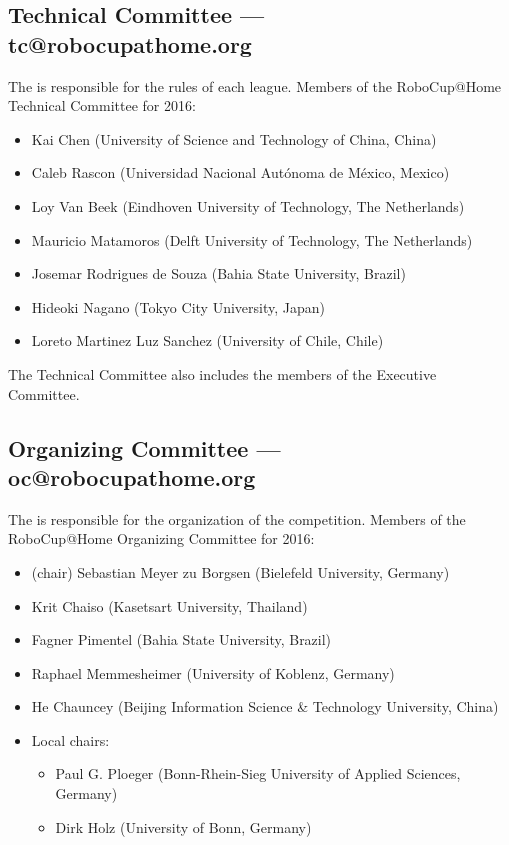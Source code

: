 \subsection{Technical Committee --- tc@robocupathome.org}
\label{sec:tc}
The  is responsible for the rules of each league. Members of the RoboCup@Home Technical Committee for 2016:
\begin{itemize}
\item Kai Chen (University of Science and Technology of China, China)
\item Caleb Rascon (Universidad Nacional Aut{\'o}noma de M{\'e}xico, Mexico)
\item Loy Van Beek (Eindhoven University of Technology, The Netherlands)
\item Mauricio Matamoros  (Delft University of Technology, The Netherlands)
\item Josemar Rodrigues de Souza (Bahia State University, Brazil)
\item Hideoki Nagano (Tokyo City University, Japan)
\item Loreto Martinez Luz Sanchez (University of Chile, Chile)
\end{itemize}
The Technical Committee also includes the members of the Executive Committee.

\subsection{Organizing Committee --- oc@robocupathome.org}
\label{sec:oc}
The  is responsible for the organization of the competition. Members of the RoboCup@Home Organizing Committee for 2016:

\begin{itemize}
\item (chair) Sebastian Meyer zu Borgsen (Bielefeld University, Germany)
\item Krit Chaiso (Kasetsart University, Thailand)
\item Fagner Pimentel (Bahia State University, Brazil)
\item Raphael Memmesheimer (University of Koblenz, Germany)
\item He Chauncey (Beijing Information Science \& Technology University, China)
\item Local chairs:
  \begin{itemize}
    \item Paul G. Ploeger (Bonn-Rhein-Sieg University of Applied Sciences, Germany) 
    \item Dirk Holz (University of Bonn, Germany)
  \end{itemize}
\end{itemize}

